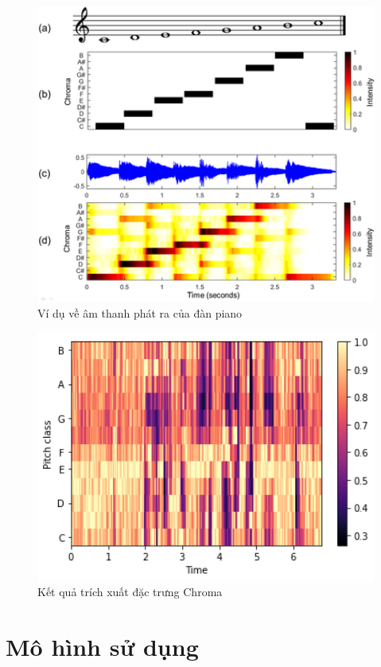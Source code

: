\documentclass[a4paper, 12pt]{article}
\begin{document}
\begin{figure}[!h]
\captionsetup{width=0.8\textwidth}
\centering
\includegraphics[width=12cm]{images/4.8.png}
\caption{Ví dụ về âm thanh phát ra của đàn piano}
\end{figure}

\begin{figure}[!h]
\captionsetup{width=0.8\textwidth}
\centering
\includegraphics[width=12cm]{images/4.4.png}
\caption{Kết quả trích xuất đặc trưng Chroma}
\end{figure}

\section{Mô hình sử dụng}
\end{document}

